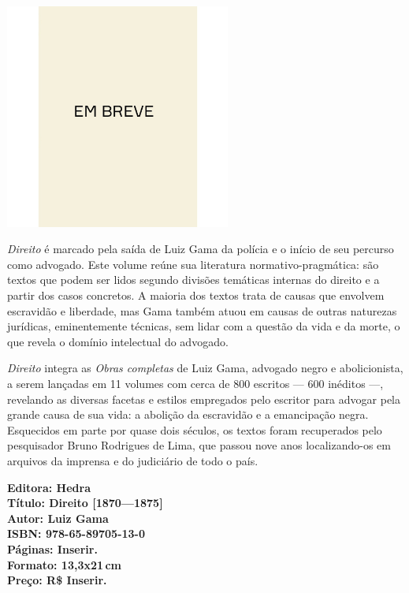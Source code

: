 \begin{center}
\hspace*{.5cm}\includegraphics[width=74mm]{./CAPAS/breve.jpeg}
\end{center}
\hspace*{-7cm}\hrulefill\hspace*{-7cm}
\medskip

\noindent{}\textit{Direito} é marcado pela saída de Luiz Gama da polícia e o início de seu percurso como advogado. Este volume reúne sua literatura normativo-pragmática: são textos que podem ser lidos segundo divisões temáticas internas do direito e a partir dos casos concretos. A maioria dos textos trata de causas que envolvem escravidão e liberdade, mas Gama também atuou em causas de outras naturezas jurídicas, eminentemente técnicas, sem lidar com a questão da vida e da morte, o que revela o domínio intelectual do advogado.

\textit{Direito} integra as \textit{Obras completas} de Luiz Gama, advogado negro e abolicionista, a serem lançadas em 11 volumes com cerca de 800 escritos --- 600 inéditos ---, revelando as diversas facetas e estilos empregados pelo escritor para advogar pela grande causa de sua vida: a abolição da escravidão e a emancipação negra. Esquecidos em parte por quase dois séculos, os textos foram recuperados pelo pesquisador Bruno Rodrigues de Lima, que passou nove anos localizando-os em arquivos da imprensa e do judiciário de todo o país.

\vfill
\noindent\begin{minipage}[c]{1\linewidth}
{\small\textbf{
\hspace*{-.1cm}Editora: Hedra\\
Título: Direito [1870—1875]\\
Autor: Luiz Gama\\ 
ISBN: 978-65-89705-13-0\\
Páginas: Inserir.\\
Formato: 13,3x21\,cm\\
Preço: R\$ Inserir.\\
}}
\end{minipage}
\pagebreak

